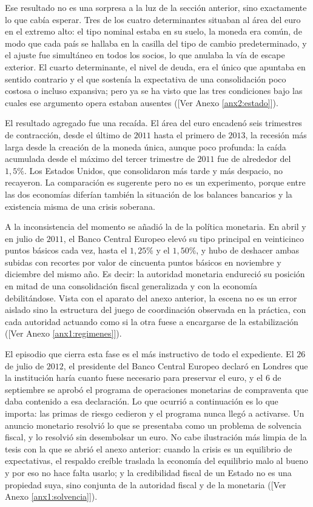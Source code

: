 \documentclass[10pt,a4paper]{article}
\newcommand{\authorfont}[1]{{\fontfamily{EBGaramond-TLF}\selectfont #1}}
\newcounter{anexo}
\begin{document}
Ese resultado no es una sorpresa a la luz de la sección anterior, sino exactamente lo que cabía esperar. Tres de los cuatro determinantes situaban al área del euro en el extremo alto: el tipo nominal estaba en su suelo, la moneda era común, de modo que cada país se hallaba en la casilla del tipo de cambio predeterminado, y el ajuste fue simultáneo en todos los socios, lo que anulaba la vía de escape exterior. El cuarto determinante, el nivel de deuda, era el único que apuntaba en sentido contrario y el que sostenía la expectativa de una consolidación poco costosa o incluso expansiva; pero ya se ha visto que las tres condiciones bajo las cuales ese argumento opera estaban ausentes ([\authorfont{Ver Anexo \ref{anx2:estado}}]).

El resultado agregado fue una recaída. El área del euro encadenó seis trimestres de contracción, desde el último de $2011$ hasta el primero de $2013$, la recesión más larga desde la creación de la moneda única, aunque poco profunda: la caída acumulada desde el máximo del tercer trimestre de $2011$ fue de alrededor del $1{,}5\%$. Los Estados Unidos, que consolidaron más tarde y más despacio, no recayeron. La comparación es sugerente pero no es un experimento, porque entre las dos economías diferían también la situación de los balances bancarios y la existencia misma de una crisis soberana.

A la inconsistencia del momento se añadió la de la política monetaria. En abril y en julio de $2011$, el Banco Central Europeo elevó su tipo principal en veinticinco puntos básicos cada vez, hasta el $1{,}25\%$ y el $1{,}50\%$, y hubo de deshacer ambas subidas con recortes por valor de cincuenta puntos básicos en noviembre y diciembre del mismo año. Es decir: la autoridad monetaria endureció su posición en mitad de una consolidación fiscal generalizada y con la economía debilitándose. Vista con el aparato del anexo anterior, la escena no es un error aislado sino la estructura del juego de coordinación observada en la práctica, con cada autoridad actuando como si la otra fuese a encargarse de la estabilización ([\authorfont{Ver Anexo \ref{anx1:regimenes}}]).

El episodio que cierra esta fase es el más instructivo de todo el expediente. El $26$ de julio de $2012$, el presidente del Banco Central Europeo declaró en Londres que la institución haría cuanto fuese necesario para preservar el euro, y el $6$ de septiembre se aprobó el programa de operaciones monetarias de compraventa que daba contenido a esa declaración. Lo que ocurrió a continuación es lo que importa: las primas de riesgo cedieron y el programa nunca llegó a activarse. Un anuncio monetario resolvió lo que se presentaba como un problema de solvencia fiscal, y lo resolvió sin desembolsar un euro. No cabe ilustración más limpia de la tesis con la que se abrió el anexo anterior: cuando la crisis es un equilibrio de expectativas, el respaldo creíble traslada la economía del equilibrio malo al bueno y por eso no hace falta usarlo; y la credibilidad fiscal de un Estado no es una propiedad suya, sino conjunta de la autoridad fiscal y de la monetaria ([\authorfont{Ver Anexo \ref{anx1:solvencia}}]).
\end{document}
